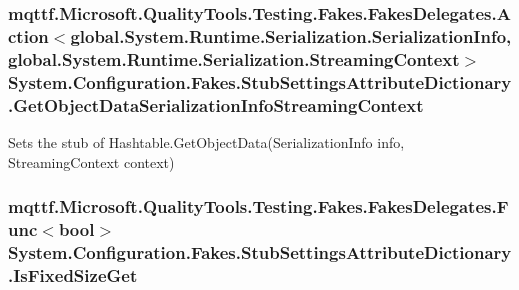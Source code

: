 \hypertarget{class_system_1_1_configuration_1_1_fakes_1_1_stub_settings_attribute_dictionary_ad6437a2fb0a60bbd22b8e73495119326}{
\subsubsection[{Get\-Object\-Data\-Serialization\-Info\-Streaming\-Context}]{\setlength{\rightskip}{0pt plus 5cm}mqttf.\-Microsoft.\-Quality\-Tools.\-Testing.\-Fakes.\-Fakes\-Delegates.\-Action$<$global.\-System.\-Runtime.\-Serialization.\-Serialization\-Info, global.\-System.\-Runtime.\-Serialization.\-Streaming\-Context$>$ System.\-Configuration.\-Fakes.\-Stub\-Settings\-Attribute\-Dictionary.\-Get\-Object\-Data\-Serialization\-Info\-Streaming\-Context}}\label{class_system_1_1_configuration_1_1_fakes_1_1_stub_settings_attribute_dictionary_ad6437a2fb0a60bbd22b8e73495119326}


Sets the stub of Hashtable.\-Get\-Object\-Data(\-Serialization\-Info info, Streaming\-Context context)

\hypertarget{class_system_1_1_configuration_1_1_fakes_1_1_stub_settings_attribute_dictionary_a6b30a2ca8abba69db5dfb744d92f2ea1}{
\subsubsection[{Is\-Fixed\-Size\-Get}]{\setlength{\rightskip}{0pt plus 5cm}mqttf.\-Microsoft.\-Quality\-Tools.\-Testing.\-Fakes.\-Fakes\-Delegates.\-Func$<$bool$>$ System.\-Configuration.\-Fakes.\-Stub\-Settings\-Attribute\-Dictionary.\-Is\-Fixed\-Size\-Get}}\label{class_system_1_1_configuration_1_1_fakes_1_1_stub_settings_attribute_dictionary_a6b30a2ca8abba69db5dfb744d92f2ea1}


